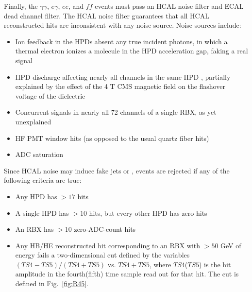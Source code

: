 \documentclass[dissertation.tex]{subfiles}
\begin{document}
Finally, the $\gamma\gamma$, $e\gamma$, $ee$, and $\mathit{ff}$ events must pass an HCAL noise filter and ECAL dead channel filter.  The HCAL noise filter guarantees that all HCAL reconstructed hits are inconsistent with any noise source.  Noise sources \cite{1748-0221-5-03-T03014} include:

\begin{itemize}
\item Ion feedback in the HPDs absent any true incident photons, in which a thermal electron ionizes a molecule in the HPD acceleration gap, faking a real signal
\item HPD discharge affecting nearly all channels in the same HPD \cite{HCAL_noise_AN}, partially explained by the effect of the 4 T CMS magnetic field on the flashover voltage of the dielectric \cite{Korzekwa}
\item Concurrent signals in nearly all 72 channels of a single RBX, as yet unexplained
\item HF PMT window hits (as opposed to the usual quartz fiber hits)
\item ADC saturation
\end{itemize}
%
Since HCAL noise may induce fake jets or \MET, events are rejected if any of the following criteria are true:

\begin{itemize}
\item Any HPD has $> 17$ hits
\item A single HPD has $> 10$ hits, but every other HPD has zero hits
\item An RBX has $> 10$ zero-ADC-count hits
\item Any HB/HE reconstructed hit corresponding to an RBX with $> 50$ GeV of energy fails a two-dimensional cut defined by the variables $(TS4 - TS5)/(TS4 + TS5)$ vs. $TS4 + TS5$, where $TS4$($TS5$) is the hit amplitude in the fourth(fifth) time sample read out for that hit.  The cut is defined in Fig.~\ref{fig:R45}.
\end{itemize}
\end{document}
